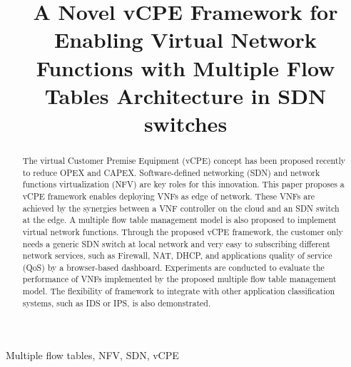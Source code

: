 \documentclass[conference]{IEEEtran}
\begin{document}
\title{A Novel vCPE Framework for Enabling Virtual Network Functions with Multiple Flow Tables Architecture in SDN switches}

\author{

}

\maketitle

\begin{abstract}
The virtual Customer Premise Equipment (vCPE) concept has been proposed recently to reduce OPEX and CAPEX. Software-defined networking (SDN) and network functions virtualization (NFV) are key roles for this innovation.
This paper proposes a vCPE framework enables deploying VNFs as edge of network.
These VNFs are achieved by the synergies between a VNF controller on the cloud and an SDN switch at the edge.
A multiple flow table management model is also proposed to implement virtual network functions.
Through the proposed vCPE framework, the customer only needs a generic SDN switch at local network and very easy to subscribing different network services, such as Firewall, NAT, DHCP, and applications quality of service (QoS) by a browser-based dashboard.
Experiments are conducted to evaluate the performance of VNFs implemented by the proposed multiple flow table management model.
The flexibility of framework to integrate with other application classification systems, such as IDS or IPS, is also demonstrated.

\end{abstract}

\begin{IEEEkeywords}
Multiple flow tables, NFV, SDN, vCPE
\end{IEEEkeywords}

\IEEEpeerreviewmaketitle{}
\end{document}

